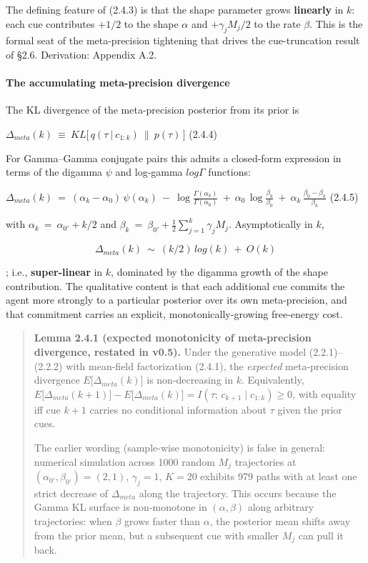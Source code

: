 \documentclass{article}
\begin{document}
The defining feature of (2.4.3) is that the shape parameter grows
\textbf{linearly} in \(k\): each cue contributes \(+ 1/2\) to the shape
\(\alpha\) and \(+ \gamma_{j}M_{j}/2\) to the rate \(\beta\). This is
the formal seat of the meta-precision tightening that drives the
cue-truncation result of \S{}2.6. Derivation: Appendix A.2.

\paragraph{The accumulating meta-precision
divergence}\label{the-accumulating-meta-precision-divergence}

The KL divergence of the meta-precision posterior from its prior is

\(\Delta_{meta}(k)\  \equiv \ KL\lbrack\, q(\tau\ |\ c_{1:k})\  \parallel \ p(\tau)\,\rbrack\)
(2.4.4)

For Gamma--Gamma conjugate pairs this admits a closed-form expression in
terms of the digamma \(\psi\) and log-gamma \(log\Gamma\) functions:

\(\Delta_{meta}(k)\  = \ (\alpha_{k} - \alpha_{0})\,\psi(\alpha_{k})\  - \ \log\frac{\Gamma(\alpha_{k})}{\Gamma(\alpha_{0})}\  + \ \alpha_{0}\,\log\frac{\beta_{k}}{\beta_{0}}\  + \ \alpha_{k}\,\frac{\beta_{0} - \beta_{k}}{\beta_{k}}\)
(2.4.5)

with \(\alpha_{k}\  = \ \alpha_{0'} + k/2\) and
\(\beta_{k}\  = \ \beta_{0'} + \frac{1}{2}\sum_{j = 1}^{k}\gamma_{j}M_{j}\).
Asymptotically in \(k\),

\[\Delta_{meta}(k)\  \sim \ (k/2)\, log(k)\  + \ O(k)\]

; i.e., \textbf{super-linear} in \(k\), dominated by the digamma growth
of the shape contribution. The qualitative content is that each
additional cue commits the agent more strongly to a particular posterior
over its own meta-precision, and that commitment carries an explicit,
monotonically-growing free-energy cost.

\begin{quote}
\textbf{Lemma 2.4.1 (expected monotonicity of meta-precision divergence,
restated in v0.5).} Under the generative model (2.2.1)--(2.2.2) with
mean-field factorization (2.4.1), the \emph{expected} meta-precision
divergence \(E\lbrack\Delta_{meta}(k)\rbrack\) is non-decreasing in
\(k\). Equivalently,
\(E\lbrack\Delta_{meta}(k + 1)\rbrack - E\lbrack\Delta_{meta}(k)\rbrack = I(\tau;\, c_{k + 1} \mid c_{1:k}) \geq 0\),
with equality iff cue \(k + 1\) carries no conditional information about
\(\tau\) given the prior cues.

The earlier wording (sample-wise monotonicity) is false in general:
numerical simulation across 1000 random \(M_{j}\) trajectories at
\((\alpha_{0'},\beta_{0'}) = (2,1)\), \(\gamma_{j} = 1\), \(K = 20\)
exhibits 979 paths with at least one strict decrease of
\(\Delta_{meta}\) along the trajectory. This occurs because the Gamma KL
surface is non-monotone in \((\alpha,\beta)\) along arbitrary
trajectories: when \(\beta\) grows faster than \(\alpha\), the posterior
mean shifts away from the prior mean, but a subsequent cue with smaller
\(M_{j}\) can pull it back.
\end{quote}
\end{document}
